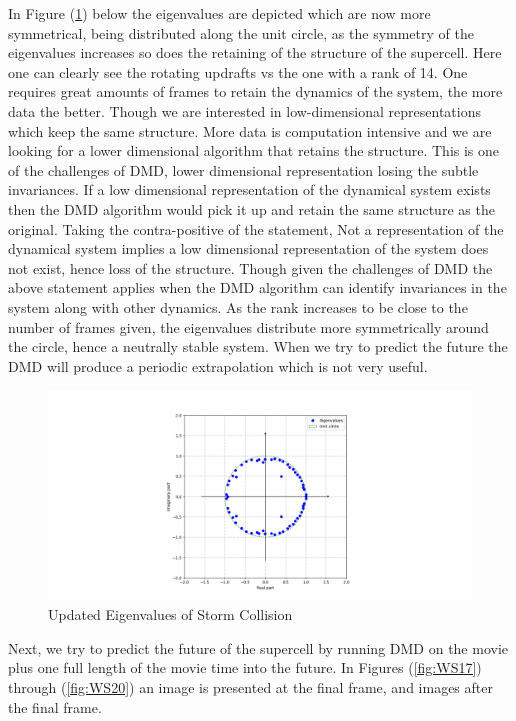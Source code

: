 \documentclass[12pt]{report}
\begin{document}
In Figure (\ref{fig:WS16}) below the eigenvalues are depicted which are now more symmetrical, being distributed along the unit circle, as the symmetry of the eigenvalues increases so does the retaining of the structure of the supercell. Here one can clearly see the rotating updrafts vs the one with a rank of 14. One requires great amounts of frames to retain the dynamics of the system, the more data the better. Though we are interested in low-dimensional representations which keep the same structure. More data is computation intensive and we are looking for a lower dimensional algorithm that retains the structure. This is one of the challenges of DMD, lower dimensional representation losing the subtle invariances. If a low dimensional representation of the dynamical system exists then the DMD algorithm would pick it up and retain the same structure as the original. Taking the contra-positive of the statement, Not a representation of the dynamical system implies a low dimensional representation of the system does not exist, hence loss of the structure. Though given the challenges of DMD the above statement applies when the DMD algorithm can identify invariances in the system along with other dynamics. As the rank increases to be close to the number of frames given, the eigenvalues distribute more symmetrically around the circle, hence a neutrally stable system. When we try to predict the future the DMD will produce a periodic extrapolation which is not very useful.

\begin{figure}[H]
    \centering
    \includegraphics[width=1.3\textwidth]{Weather pics/WS16.png}
    \caption{Updated Eigenvalues of Storm Collision} \label{fig:WS16}
\end{figure}
\noindent

Next, we try to predict the future of the supercell by running DMD on the
movie plus one full length of the movie time into the future. In Figures (\ref{fig:WS17}) through (\ref{fig:WS20}) an image is presented at the final frame, and images after the final frame.
\end{document}
